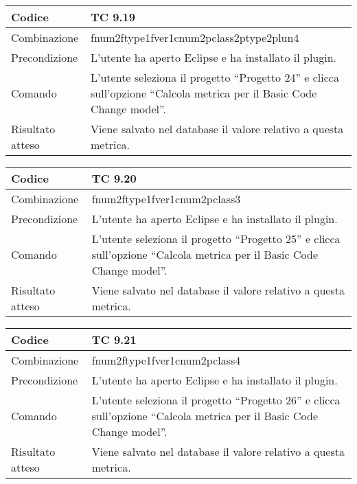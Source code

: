 \begin{table}[ht]
\begin{tabular}{|p{3cm}|p{9cm}|}
\hline
\cellcolor{lightgray}Codice				& TC 9.19								\\
\hline
\cellcolor{lightgray}Combinazione		& fnum2ftype1fver1cnum2pclass2ptype2plun4									\\
\hline
\cellcolor{lightgray}Precondizione		& L'utente ha aperto Eclipse e ha installato il plugin.		\\
\hline
\cellcolor{lightgray}Comando			& L'utente seleziona il progetto ``Progetto 24''  e clicca sull'opzione ``Calcola metrica per il Basic Code Change model''.	\\
\hline
\cellcolor{lightgray}Risultato atteso	& Viene salvato nel database il valore relativo a questa metrica.\\
\hline
\end{tabular}
\end{table}

\begin{table}[ht]
\begin{tabular}{|p{3cm}|p{9cm}|}
\hline
\cellcolor{lightgray}Codice				& TC 9.20								\\
\hline
\cellcolor{lightgray}Combinazione		& fnum2ftype1fver1cnum2pclass3									\\
\hline
\cellcolor{lightgray}Precondizione		& L'utente ha aperto Eclipse e ha installato il plugin.		\\
\hline
\cellcolor{lightgray}Comando			& L'utente seleziona il progetto ``Progetto 25''  e clicca sull'opzione ``Calcola metrica per il Basic Code Change model''.	\\
\hline
\cellcolor{lightgray}Risultato atteso	& Viene salvato nel database il valore relativo a questa metrica.\\
\hline
\end{tabular}
\end{table}

\begin{table}[ht]
\begin{tabular}{|p{3cm}|p{9cm}|}
\hline
\cellcolor{lightgray}Codice				& TC 9.21								\\
\hline
\cellcolor{lightgray}Combinazione		& fnum2ftype1fver1cnum2pclass4									\\
\hline
\cellcolor{lightgray}Precondizione		& L'utente ha aperto Eclipse e ha installato il plugin.		\\
\hline
\cellcolor{lightgray}Comando			& L'utente seleziona il progetto ``Progetto 26''  e clicca sull'opzione ``Calcola metrica per il Basic Code Change model''.	\\
\hline
\cellcolor{lightgray}Risultato atteso	& Viene salvato nel database il valore relativo a questa metrica.\\
\hline
\end{tabular}
\end{table}

